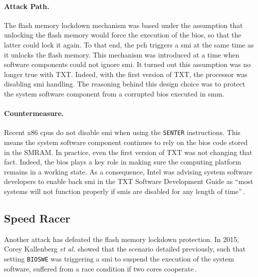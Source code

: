 \paragraph{Attack Path.}
%
The flash memory lockdown mechanism was based under the assumption that
unlocking the flash memory would force the execution of the \ac{bios}, so that
the latter could lock it again.
%
To that end, the \ac{pch} triggers a \ac{smi} at the same time as it unlocks
the flash memory.
%
This mechanism was introduced at a time when software components could not
ignore \ac{smi}.
%
It turned out this assumption was no longer true with TXT.
%
Indeed, with the first version of TXT, the processor was disabling \ac{smi}
handling.
%
The reasoning behind this design choice was to protect the system software
component from a corrupted \ac{bios} executed in \ac{smm}.

\paragraph{Countermeasure.}
%
Recent x86 \acp{cpu} do not disable \ac{smi} when using the \texttt{SENTER}
instructions.
%
This means the system software component continues to rely on the \ac{bios} code
stored in the SMRAM.
%
In practice, even the first version of TXT was not changing that fact.
%
Indeed, the \ac{bios} plays a key role in making sure the computing platform
remains in a working state.
%
As a consequence, Intel was advising system software developers to enable back
\ac{smi} in the TXT Software Development Guide as ``most systems will not
function properly if \acp{smi} are disabled for any length of
time''\,\cite{intel2015txt}.

\subsection{Speed Racer}
\label{subsec:usecase:hse:speed}

Another attack has defeated the flash memory lockdown
protection.
%
In 2015, Corey Kallenberg \emph{et al.} showed that the scenario detailed
previously, such that setting \texttt{BIOSWE} was triggering a \ac{smi} to
suspend the execution of the system software, suffered from a race condition if
two cores cooperate\,\cite{kallenberg2015racecondition}.

